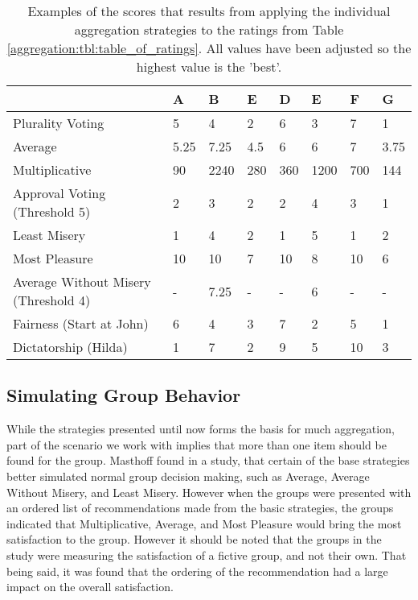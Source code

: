 \begin{table}[H]
	\centering
	\begin{tabular}{ | p{2.5cm} | p{1cm} | p{1cm} | p{1cm} | p{1cm} | p{1cm} | p{1cm} | p{1cm} | } \hline
		& \textbf{A} & \textbf{B} & \textbf{E} & \textbf{D} & \textbf{E} & \textbf{F} & \textbf{G}  \\ \hline
		Plurality Voting & 5 & 4 & 2 & 6 & 3 & 7 & 1 \\ \hline
		Average & 5.25 & 7.25 & 4.5 & 6 & 6 & 7 & 3.75 \\ \hline
		Multiplicative & 90 & 2240 & 280 & 360 & 1200 & 700 & 144 \\ \hline
		Approval Voting (Threshold 5) & 2 & 3 & 2 & 2 & 4 & 3 & 1 \\ \hline
		Least Misery & 1 & 4 & 2 & 1 & 5 & 1 & 2 \\ \hline
		Most Pleasure & 10 & 10 & 7 & 10 & 8 & 10 & 6 \\ \hline
		Average Without Misery (Threshold 4) & - & 7.25 & - & - & 6 & - & - \\ \hline
		Fairness (Start at John) & 6 & 4 & 3 & 7 & 2 & 5 & 1 \\ \hline
		Dictatorship (Hilda) & 1 & 7 & 2 & 9 & 5 & 10 & 3 \\ \hline
	\end{tabular}
	\caption{Examples of the scores that results from applying the individual aggregation strategies to the ratings from Table \ref{aggregation:tbl:table_of_ratings}. All values have been adjusted so the highest value is the 'best'.}
	\label{aggregation:tbl:examples_of_strategies}
\end{table}

\subsection{Simulating Group Behavior} \label{bg:aggregation:groupbehavior}
While the strategies presented until now forms the basis for much aggregation, part of the scenario we work with implies that more than one item should be found for the group. Masthoff found in a study, that certain of the base strategies better simulated normal group decision making, such as Average, Average Without Misery, and Least Misery\cite{Masthoff2004}. However when the groups were presented with an ordered list of recommendations made from the basic strategies, the groups indicated that Multiplicative, Average, and Most Pleasure would bring the most satisfaction to the group. However it should be noted that the groups in the study were measuring the satisfaction of a fictive group, and not their own. That being said, it was found that the ordering of the recommendation had a large impact on the overall satisfaction.

